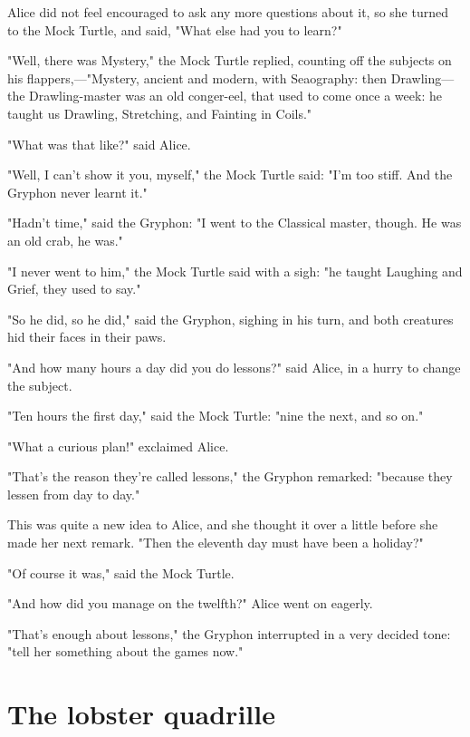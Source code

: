 Alice did not feel encouraged to ask any more questions about it, so she turned to the Mock Turtle, and said, "What else had you to learn?"

"Well, there was Mystery," the Mock Turtle replied, counting off the subjects on his flappers,—"Mystery, ancient and modern, with Seaography: then Drawling—the Drawling-master was an old conger-eel, that used to come once a week: he taught us Drawling, Stretching, and Fainting in Coils."

"What was that like?" said Alice.

​"Well, I can't show it you, myself," the Mock Turtle said: "I'm too stiff. And the Gryphon never learnt it."

"Hadn't time," said the Gryphon: "I went to the Classical master, though. He was an old crab, he was."

"I never went to him," the Mock Turtle said with a sigh: "he taught Laughing and Grief, they used to say."

"So he did, so he did," said the Gryphon, sighing in his turn, and both creatures hid their faces in their paws.

"And how many hours a day did you do lessons?" said Alice, in a hurry to change the subject.

"Ten hours the first day," said the Mock Turtle: "nine the next, and so on."

"What a curious plan!" exclaimed Alice.

"That's the reason they're called lessons," the Gryphon remarked: "because they lessen from day to day."

This was quite a new idea to Alice, and she ​thought it over a little before she made her next remark. "Then the eleventh day must have been a holiday?"

"Of course it was," said the Mock Turtle.

"And how did you manage on the twelfth?" Alice went on eagerly.

"That's enough about lessons," the Gryphon interrupted in a very decided tone: "tell her something about the games now."

\quebra\chapter*{The lobster quadrille}

